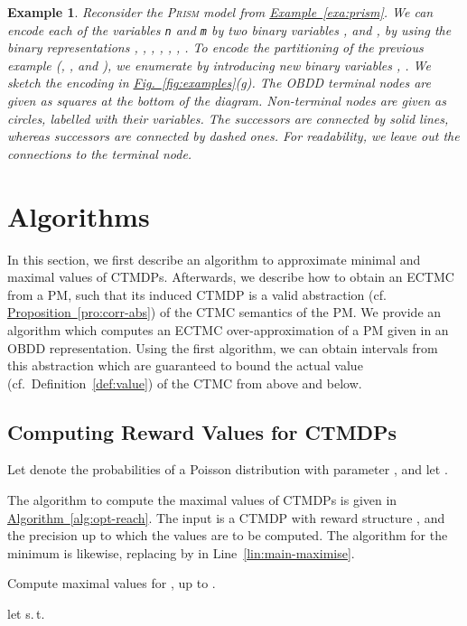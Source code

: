 \documentclass[10pt,twocolumn]{article}
\newtheorem{example}{Example}
\newcommand{\PRISM}{\textsc{Prism}\xspace}
\newcommand{\reffig}[1]{\texorpdfstring{\hyperref[fig:#1]{Fig.~\ref*{fig:#1}}}{Fig.~\ref*{fig:#1}}}
\newcommand{\refpro}[1]{\texorpdfstring{\hyperref[pro:#1]{Proposition~\ref*{pro:#1}}}{Proposition~\ref*{pro:#1}}}
\newcommand{\refexa}[1]{\texorpdfstring{\hyperref[exa:#1]{Example~\ref*{exa:#1}}}{Example~\ref*{exa:#1}}}
\newcommand{\refalg}[1]{\texorpdfstring{\hyperref[alg:#1]{Algorithm~\ref*{alg:#1}}}{Algorithm~\ref*{alg:#1}}}
\begin{document}
\begin{example}
  Reconsider the \PRISM model from \refexa{prism}.
  We can encode each of the variables \texttt{n} and \texttt{m} by two binary variables ,  and ,  by using the binary representations
  ,
  ,
  ,
  ,
  ,
  ,
  .
  To encode the partitioning of the previous example (, , 
  and ), we enumerate  by introducing new binary variables , .
  We sketch the encoding in \reffig{examples}(g).
  The OBDD terminal nodes are given as squares at the bottom of the diagram.
  Non-terminal nodes are given as circles, labelled with their variables.
  The  successors are connected by solid lines, whereas  successors are connected by dashed ones.
  For readability, we leave out the connections to the  terminal node.
\end{example}

\section{Algorithms}
\label{sec:algorithms}
\noindent In this section, we first describe an algorithm to
approximate minimal and maximal values of CTMDPs. Afterwards, we
describe how to obtain an ECTMC from a PM, such that its induced CTMDP
is a valid abstraction (cf. \refpro{corr-abs}) of the CTMC semantics
of the PM. We provide an algorithm which computes an ECTMC
over-approximation of a PM given in an OBDD representation. Using the
first algorithm, we can obtain intervals from this abstraction which
are guaranteed to bound the actual value (cf.~Definition~\ref{def:value})
of the CTMC from above and below.

\subsection{Computing Reward Values for CTMDPs}

\noindent Let  denote 
the probabilities of a Poisson distribution with parameter , and let 
.

The algorithm to compute the maximal values of CTMDPs is given in \refalg{opt-reach}.
The input is a CTMDP  with reward structure ,
and the precision  up to which the values are to be computed.
The algorithm for the minimum is likewise, replacing  by 
in Line~\ref{lin:main-maximise}.
\begin{algorithm}
  \caption{\label{alg:opt-reach}Compute maximal values for ,  up to .}
  \DontPrintSemicolon
  let  s.\,t.  \label{lin:choice_k} \;
   \;
  \lForAll{} {\label{lin:init} \;
  }
  \ForAll{} { \label{lin:main-start}
    \ForAll{} {
       \label{lin:asg-max} \; \label{lin:main-maximise}
       \;
      \label{lin:last-inner}
    }
  }
  \Return 
\end{algorithm}
\end{document}
